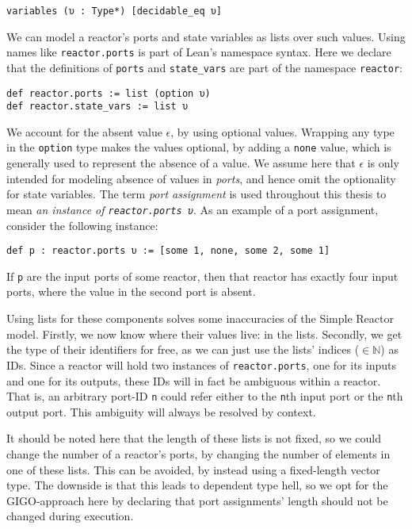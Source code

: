 \begin{lstlisting}
variables (υ : Type*) [decidable_eq υ]
\end{lstlisting}

\noindent We can model a reactor's ports and state variables as lists over such values.
Using names like \lstinline{reactor.ports} is part of Lean's namespace syntax. 
Here we declare that the definitions of \lstinline{ports} and \lstinline{state_vars} are part of the namespace \lstinline{reactor}:

\begin{lstlisting}
def reactor.ports := list (option υ)
def reactor.state_vars := list υ
\end{lstlisting}

\noindent We account for the absent value $\epsilon$, by using optional values.
Wrapping any type in the \lstinline{option} type makes the values optional, by adding a \lstinline{none} value, which is generally used to represent the absence of a value.
We assume here that $\epsilon$ is only intended for modeling absence of values in \emph{ports}, and hence omit the optionality for state variables.
The term \emph{port assignment} is used throughout this thesis to mean \emph{an instance of \lstinline{reactor.ports υ}}.
As an example of a port assignment, consider the following instance:

\begin{lstlisting}
def p : reactor.ports υ := [some 1, none, some 2, some 1]
\end{lstlisting}

\noindent If \lstinline{p} are the input ports of some reactor, then that reactor has exactly four input ports, where the value in the second port is absent.

Using lists for these components solves some inaccuracies of the Simple Reactor model. 
Firstly, we now know where their values live: in the lists. 
Secondly, we get the type of their identifiers for free, as we can just use the lists' indices ($\in \mathbb{N}$) as IDs.
Since a reactor will hold two instances of \lstinline{reactor.ports}, one for its inputs and one for its outputs, these IDs will in fact be ambiguous within a reactor.
That is, an arbitrary port-ID \verb|n| could refer either to the \verb|n|th input port or the \verb|n|th output port. 
This ambiguity will always be resolved by context.

It should be noted here that the length of these lists is not fixed, so we could change the number of a reactor's ports, by changing the number of elements in one of these lists.
This can be avoided, by instead using a fixed-length vector type.
The downside is that this leads to dependent type hell, so we opt for the GIGO-approach here by declaring that port assignments' length should not be changed during execution.

